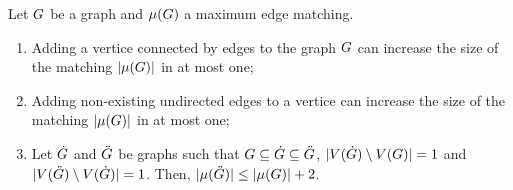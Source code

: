 \documentclass[msc]{ppgccufmg}    %
\begin{document}
\begin{lemma}
\label{lem:matching_inc_one}
Let $G$ be a graph and $\mu(G)$ a maximum edge matching.
\begin{enumerate}
    \item Adding a vertice connected by edges to the graph $G$ can increase the size of the matching 
$|\mu(G)|$ in at most one; %
    \item Adding non-existing undirected edges to a vertice can increase the size of the matching 
$|\mu(G)|$ in at most one; %
    \item Let $\dot{G}$ and $\ddot{G}$ be graphs such that $G \subseteq \dot{G}
    \subseteq \ddot{G}$, $|V(\dot{G}) \setminus V(G)| = 1$
    and $|V(\ddot{G}) \setminus V(\dot{G}) | = 1$.
    Then, $|\mu(\ddot{G})| \leq |\mu(G)| + 2$.
\end{enumerate}
\end{lemma}
\end{document}
